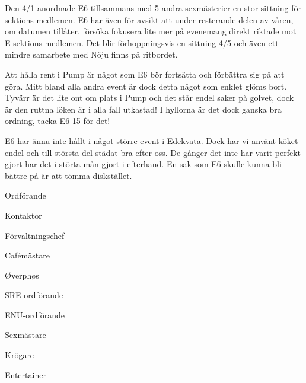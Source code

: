 \documentclass[../_main/handlingar.tex]{subfiles}
\begin{document}
Den 4/1 anordnade E6 tillsammans med 5 andra sexmästerier en stor sittning för sektions-medlemen. E6 har även för avsikt att under resterande delen av våren, om datumen tillåter, försöka fokusera lite mer på evenemang direkt riktade mot E-sektions-medlemen. Det blir förhoppningsvis en sittning 4/5 och även ett mindre samarbete med Nöju finns på ritbordet.

Att hålla rent i Pump är något som E6 bör fortsätta och förbättra sig på att göra. Mitt bland alla andra event är dock detta något som enklet glöms bort. Tyvärr är det lite ont om plats i Pump och det står endel saker på golvet, dock är den ruttna löken är i alla fall utkastad! I hyllorna är det dock ganska bra ordning, tacka E6-15 för det!

E6 har ännu inte hållt i något större event i Edekvata. Dock har vi använt köket endel och till största del städat bra efter oss. De gånger det inte har varit perfekt gjort har det i störta mån gjort i efterhand. En sak som E6 skulle kunna bli bättre på är att tömma diskstället.

\newpage
\begin{signatures}{10}
    \mvh
    \signature{Fredrik Peterson}{Ordförande}
    \signature{Erik Månsson}{Kontaktor}
    \signature{Anders Nilsson}{Förvaltningschef}
    \signature{Stephanie Mirsky}{Cafémästare}
    \signature{Molly Rusk}{Øverphøs}
    \signature{Johan Persson}{SRE-ordförande}
    \signature{Johannes Koch}{ENU-ordförande}
    \signature{Martin Gemborn Nilsson}{Sexmästare}
    \signature{Malin Lindström}{Krögare}
    \signature{Dalia Khairallah}{Entertainer}
\end{signatures}
\end{document}
